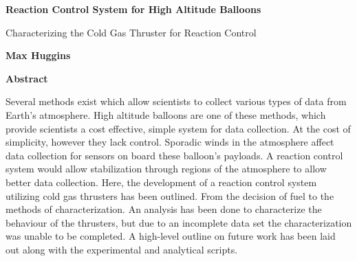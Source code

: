 \thispagestyle{plain}
\begin{center}
    \large
    \textbf{Reaction Control System for High Altitude Balloons}
        
    \vspace{0.4cm}
    \normalsize
    Characterizing the Cold Gas Thruster for Reaction Control
        
    \vspace{0.4cm}
    \textbf{Max Huggins}
       
    \vspace{0.9cm}
    \textbf{Abstract}
\end{center}
Several methods exist which allow scientists to collect various types of data from Earth's atmosphere. High altitude balloons are one of these methods, which provide scientists a cost effective, simple system for data collection. At the cost of simplicity, however they lack control. Sporadic winds in the atmosphere affect data collection for sensors on board these balloon's payloads. A reaction control system would allow stabilization through regions of the atmosphere to allow better data collection. Here, the development of a reaction control system utilizing cold gas thrusters has been outlined. From the decision of fuel to the methods of characterization. An analysis has been done to characterize the behaviour of the thrusters, but due to an incomplete data set the characterization was unable to be completed. A high-level outline on future work has been laid out along with the experimental and analytical scripts.
